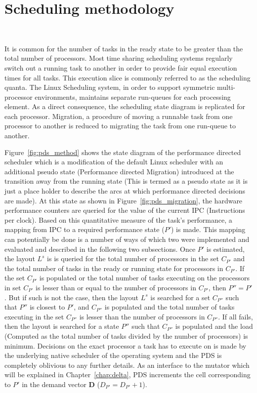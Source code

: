 \section{Scheduling methodology}~\label{sec:pds}

It is common for the number of tasks in the ready state to be greater than the total number
of processors. Most time sharing scheduling systems regularly switch out a running task
to another in order to provide fair equal execution times for all tasks. This execution slice is commonly 
referred to as the scheduling quanta. The Linux Scheduling system, in order to support symmetric 
multi-processor environments, maintains separate run-queues
for each processing element. As a direct consequence, the scheduling state diagram is replicated for each processor. 
Migration, a procedure of moving a runnable task from one processor to another is reduced to migrating the task from
one run-queue to another. 

Figure~\ref{fig:pds_method} shows the state diagram of the performance directed scheduler which is a modification of
the default Linux scheduler with an additional pseudo state (Performance directed Migration) introduced at the transition 
away from the running state (This is termed as a pseudo state as it is just a place holder to describe the arcs at 
which performance directed decisions are made). At this state as shown in Figure~\ref{fig:pds_migration}, the hardware 
performance counters are queried for the value of the current IPC (Instructions per clock). 
Based on this quantitative measure of the task's performance,
a mapping from IPC to a required performance state ($P'$) is made. This mapping can potentially be done is a number of ways 
of which two were implemented and evaluated and described in the following two subsections. Once $P'$ is estimated, 
the layout $L^s$ is is queried for the total number of processors in the set $C_{P'}$ and the total number of tasks in the 
ready or running state for processors in $C_{P'}$. If the set $C_{P'}$ is populated or the total number of tasks executing 
on the processors in set $C_{P'}$ is lesser than or equal
to the number of processors in $C_{P'}$, then $P'' = P'$. But if such is not the case, then the layout $L^s$ is searched
for a set $C_{P''}$ such that $P''$ is closest to $P'$, and $C_{P''}$ is populated and the total number of tasks 
executing in the set $C_{P''}$ is lesser than the number of processors in $C_{P''}$. If all fails, then the layout
is searched for a state $P''$ such that $C_{P''}$ is populated and the load (Computed as the total number of tasks 
divided by the number of processors) is minimum. Decisions on the exact processor a task has to execute on is made by the 
underlying native scheduler of the operating system and the PDS is completely oblivious to any further details.
As an interface to the mutator which will be explained in Chapter~\ref{chap:delta}, PDS
increments the cell corresponding to $P'$ in the demand vector \textbf{D} ($D_{P'} = D_{P'} + 1$).

